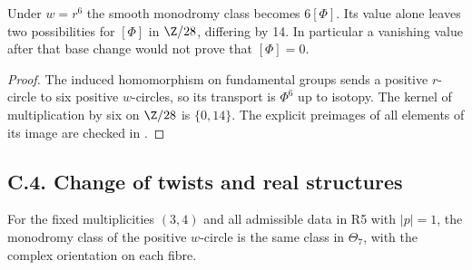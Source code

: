 \begin{proposition}
Under $w=r^6$ the smooth monodromy class becomes $6[\Phi]$.
Its value alone leaves two possibilities for $[\Phi]$ in $\Z/28$,
differing by 14. In particular a vanishing value after that base
change would not prove that $[\Phi]=0$.
\end{proposition}
\begin{proof}
The induced homomorphism on fundamental groups sends a positive
$r$-circle to six positive $w$-circles, so its transport is
$\Phi^6$ up to isotopy. The kernel of multiplication by six on
$\Z/28$ is $\{0,14\}$. The explicit preimages of all elements
of its image are checked in .
\end{proof}


























\subsection{C.4. Change of twists and real structures}

\begin{proposition}
For the fixed multiplicities $(3,4)$ and all admissible data in R5
with $|p|=1$, the monodromy class of the positive $w$-circle is the
same class in $\Theta_7$, with the complex orientation on each fibre.
\end{proposition}

